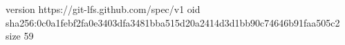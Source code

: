 version https://git-lfs.github.com/spec/v1
oid sha256:0c0a1febf2fa0e3403dfa3481bba515d20a2414d3d1bb90c74646b91faa505c2
size 59
